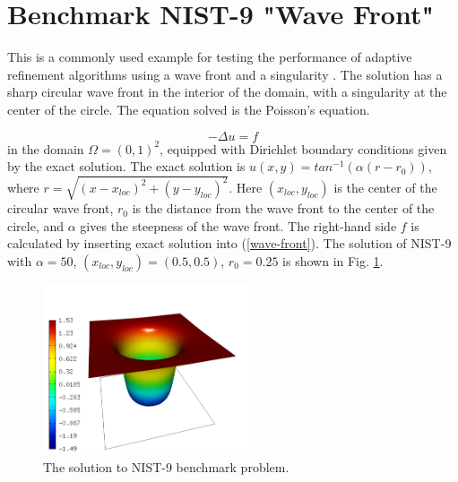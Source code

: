 \section{Benchmark NIST-9 "Wave Front"}
\label{sec:bench-9}

This is a commonly used example for testing the performance of
adaptive refinement algorithms using a wave front and a singularity \cite{mitchell-1, mitchell-2}.
The solution has a sharp circular wave front in the interior of the
domain, with a singularity at the center of the circle.
The equation solved is the Poisson's equation.

\begin{equation} \label{wave-front}
-\Delta u = f
\end{equation}
in the domain $\Omega = (0, 1)^2$, equipped with Dirichlet boundary conditions
given by the exact solution. The exact solution is
$u(x, y) = tan^{-1}(\alpha (r - r_{0}))$,
where $r = \sqrt{(x - x_{loc})^{2} + (y - y_{loc})^{2}}$.
Here $(x_{loc}, y_{loc})$ is the center of the circular wave front,
$r_{0}$ is the distance from the wave front to the center of the circle,
and $\alpha$ gives the steepness of the wave front.
The right-hand side $f$ is calculated by inserting exact solution into (\ref{wave-front}).
The solution of NIST-9 with $\alpha = 50$, $(x_{loc}, y_{loc}) = (0.5, 0.5)$,
$r_{0} = 0.25$ is shown in Fig. \ref{fig:sln-nist09}.

\begin{figure}[!ht]
\centering
\includegraphics[height=5cm]{nist/nist-9/solution.png}
\caption{The solution to NIST-9 benchmark problem.}
\label{fig:sln-nist09}
\end{figure}

